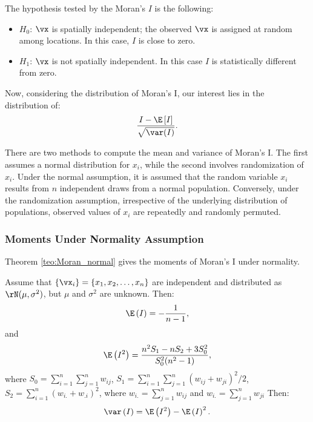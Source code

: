 The hypothesis tested by the Moran's $I$ is the following:
\begin{itemize}
  \item $H_0$: $\vx$ is spatially independent; the observed $\vx$ is assigned at random among locations. In this case, $I$ is close to zero.
  \item $H_1$: $\vx$ is not spatially independent. In this case $I$ is statistically different from zero. 
\end{itemize}

Now, considering the distribution of Moran's I, our interest lies in the distribution of:
\begin{equation*}
  \frac{I - \E\left[I\right]}{\sqrt{\var(I)}}.
\end{equation*}

There are two methods to compute the mean and variance of Moran's I. The first assumes a normal distribution for $x_i$, while the second involves randomization of $x_i$. Under the normal assumption, it is assumed that the random variable $x_i$ results from $n$ independent draws from a normal population. Conversely, under the randomization assumption, irrespective of the underlying distribution of populations, observed values of $x_i$ are repeatedly and randomly permuted.

\subsubsection{Moments Under Normality Assumption}

Theorem \ref{teo:Moran_normal} gives the moments of Moran's I under normality. 

\begin{theorem}\label{teo:Moran_normal}
Assume that $\left\lbrace \vx_i\right\rbrace = \left\lbrace x_1, x_2,\ldots, x_n\right\rbrace$ are independent and distributed as $\rN(\mu, \sigma^2)$, but $\mu$ and $\sigma^2$ are unknown. Then:
\begin{equation*}
\E\left(I\right) = - \frac{1}{n - 1}, 
\end{equation*}
%
and
\begin{equation*}
\E\left(I^2\right) = \frac{n^2S_1 - nS_2 + 3S_0^2}{S_0^2(n^2 - 1)},
\end{equation*}
%
where $S_0=\sum_{i = 1}^n\sum_{j=1}^nw_{ij}$, $S_1= \sum_{i = 1}^n\sum_{j = 1}^n(w_{ij} + w_{ji})^2/2$, $S_2 = \sum_{i = 1}^n(w_{i.} + w_{.i})^2$, where $w_{i.}= \sum_{j = 1}^nw_{ij}$ and $w_{i.}=\sum_{j = 1}^nw_{ji}$
Then:
\begin{equation*}
\var\left(I\right)=\E\left(I^2\right) - \E\left(I\right)^2.
\end{equation*}
\end{theorem}

